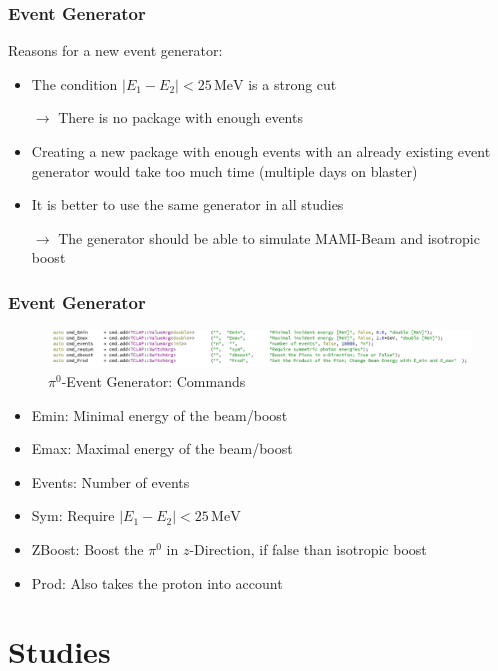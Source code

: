 \documentclass[slidestop,compress,mathserif]{beamer}
\begin{document}
\begin{frame}
\frametitle{Event Generator}
Reasons for a new event generator:

\begin{itemize}
	\item The condition $|E_1 - E_2|<25\,\text{MeV}$ is a strong cut 
	
	$\rightarrow$ There is no package with enough events
	\pause
	
	\item Creating a new package with enough events with an already existing event generator would take too much time (multiple days on blaster)
	\pause
	
	\item It is better to use the same generator in all studies
	
	$\rightarrow$ The generator should be able to simulate MAMI-Beam and isotropic boost
\end{itemize}
\end{frame}

\begin{frame}
	\frametitle{Event Generator}
	\begin{figure}
		\includegraphics[width=1.1\textwidth]{Pictures/Gun}
		\caption{$\pi^0$-Event Generator: Commands}
	\end{figure}
	\begin{itemize}
		\item Emin: Minimal energy of the beam/boost
		\item Emax: Maximal energy of the beam/boost
		\item Events: Number of events
		\item Sym: Require $|E_{1}-E_{2}|<25\,\text{MeV}$
		\item ZBoost: Boost the $\pi^0$ in $z$-Direction, if false than isotropic boost
		\item Prod: Also takes the proton into account
	\end{itemize}
\end{frame}

\section{Studies}
\end{document}
